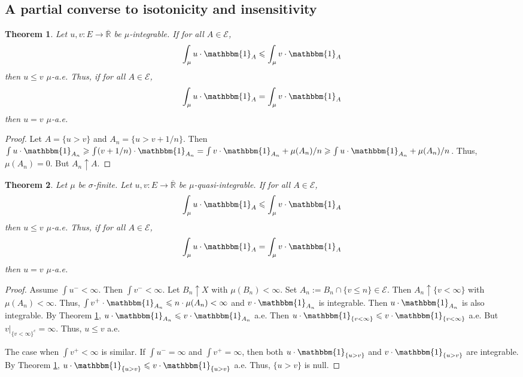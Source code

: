 \documentclass[11pt, a4paper, openany]{book}
\newtheorem{thm}{Theorem}\newtheorem{lem}{Lemma}\newtheorem{crl}{Corollary}
\theoremstyle{definition}
\newcommand{\er}{\overline{\mathbb{R}}}
\begin{document}
\subsection{A partial converse to isotonicity and insensitivity}
    \begin{thm}\label{partial converse to isotonicity and insensitivity for integrable functions}
        Let $u,v:E\rightarrow \er$ be $\mu$-integrable. If for all $A\in\mathscr{E}$,
        \[
            \int_\mu u\cdot\mathbbm{1}_A\leqslant \int_\mu v\cdot\mathbbm{1}_A
        \]
        then $u\leqslant v$ $\mu$-a.e. Thus, if for all $A\in\mathscr{E}$,
        \[
            \int_\mu u\cdot\mathbbm{1}_A= \int_\mu v\cdot\mathbbm{1}_A
        \]
        then $u=v$ $\mu$-a.e.
    \end{thm}
    \begin{proof}
        Let $A=\{u>v\}$ and $A_n=\{u>v+1/n\}$. Then $\int u\cdot\mathbbm{1}_{A_n}\geqslant \int (v+1/n)\cdot\mathbbm{1}_{A_n}=\int v\cdot\mathbbm{1}_{A_n}+\mu(A_n)/n\geqslant \int u\cdot\mathbbm{1}_{A_n}+\mu(A_n)/n$. Thus, $\mu(A_n)=0$. But $A_n\uparrow A$.
    \end{proof}
    \begin{thm}
        Let $\mu$ be $\sigma$-finite. Let $u,v:E\rightarrow \er$ be $\mu$-quasi-integrable. If for all $A\in\mathscr{E}$,
        \[
            \int_\mu u\cdot\mathbbm{1}_A\leqslant \int_\mu v\cdot\mathbbm{1}_A
        \]
        then $u\leqslant v$ $\mu$-a.e. Thus, if for all $A\in\mathscr{E}$,
        \[
            \int_\mu u\cdot\mathbbm{1}_A= \int_\mu v\cdot\mathbbm{1}_A
        \]
        then $u=v$ $\mu$-a.e.
    \end{thm}
    \begin{proof}
        Assume $\int u^-<\infty$. Then $\int v^-<\infty$. Let $B_n\uparrow X$ with $\mu(B_n)<\infty$. Set $A_n:=B_n\cap \{v\leqslant n\}\in\mathscr{E}$. Then $A_n\uparrow \{v<\infty\}$ with $\mu(A_n)<\infty$. Thus, $\int v^+\cdot\mathbbm{1}_{A_n}\leqslant n\cdot\mu(A_n)<\infty$ and $v\cdot \mathbbm{1}_{A_n}$ is integrable. Then $u\cdot \mathbbm{1}_{A_n}$ is also integrable. By Theorem \ref{partial converse to isotonicity and insensitivity for integrable functions}, $u\cdot \mathbbm{1}_{A_n}\leqslant v\cdot\mathbbm{1}_{A_n}$ a.e. Then $u\cdot \mathbbm{1}_{\{v<\infty\}}\leqslant v\cdot\mathbbm{1}_{\{v<\infty\}}$ a.e. But $v|_{\{v<\infty\}^c}=\infty$. Thus, $u\leqslant v$ a.e.

        The case when $\int v^+<\infty$ is similar. If $\int u^-=\infty$ and $\int v^+=\infty$, then both $u\cdot\mathbbm{1}_{\{u>v\}}$ and $v\cdot\mathbbm{1}_{\{u>v\}}$ are integrable. By Theorem \ref{partial converse to isotonicity and insensitivity for integrable functions}, $u\cdot\mathbbm{1}_{\{u>v\}}\leqslant v\cdot\mathbbm{1}_{\{u>v\}}$ a.e. Thus, $\{u>v\}$ is null.
    \end{proof}
\end{document}
